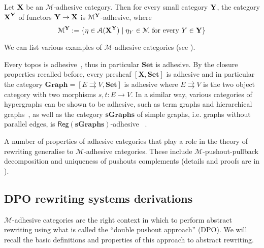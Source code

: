 \documentclass[a4paper,UKenglish,cleveref,pdftex,thm-restate,numberwithinsect,anonymous]{lipics}
\newcommand{\reg}{\mathsf{Reg}}
\newcommand{\cat}[1]{\ensuremath{\mathbf{#1}}}
\def\X{\textbf {\textup{X}}}
\def\Y{\textbf {\textup{Y}}}
\begin{document}
\begin{theorem}
  \label{thm:functors}
  Let $\X$ be an $\mathcal{M}$-adhesive category. Then for every small
  category $\Y$, the category $\X^\Y$ of functors $\Y\to \X$ is
  $\mathcal{M}^{\Y}$-adhesive, where
  \[\mathcal{M}^{\Y}:=\{\eta \in \mathcal{A}(\X^\Y) \mid \eta_Y \in
    \mathcal{M} \text{ for every } Y\in \Y\}\]
\end{theorem}

We can list various examples of $\mathcal{M}$-adhesive categories (see
\cite{castelnovo2023thesis,CastelnovoGM22,lack2006toposes}).


\begin{example}
  \label{ex:adhesive}
  Every topos is adhesive~\cite{lack2006toposes}, thus in particular
  $\cat{Set}$ is adhesive. By the closure properties recalled before,
  every presheaf $[\cat{X},\cat{Set}]$ is adhesive and in particular
  the category $\cat{Graph} = [ E \rightrightarrows V, \cat{Set}]$ is
  adhesive where $E \rightrightarrows {V}$ is the two object category
  with two morphisms $s,t \colon{E} \to {V}$. In a similar way,
  various categories of hypergraphs can be shown to be adhesive, 
  such as term graphs and hierarchical graphs~\cite{CastelnovoGM24},
  as well as the category $\cat{sGraphs}$ of simple graphs, i.e. graphs without
  parallel edges, is $\reg{(\cat{sGraphs})}$-adhesive~\cite{xxx}
.%
\end{example}


A number of properties of adhesive categories that play a role in the
theory of rewriting generalise to $\mathcal{M}$-adhesive
categories. These include $\mathcal{M}$-pushout-pullback decomposition
and uniqueness of pushouts complements (details and proofs are in
).

\subsection{DPO rewriting systems derivations}\label{subsec:DPO}

$\mathcal{M}$-adhesive categories are the right context in which to
perform abstract rewriting using what is called the ``double pushout
approach'' (DPO). We will recall the basic definitions and properties
of this approach to abstract rewriting.
\end{document}
